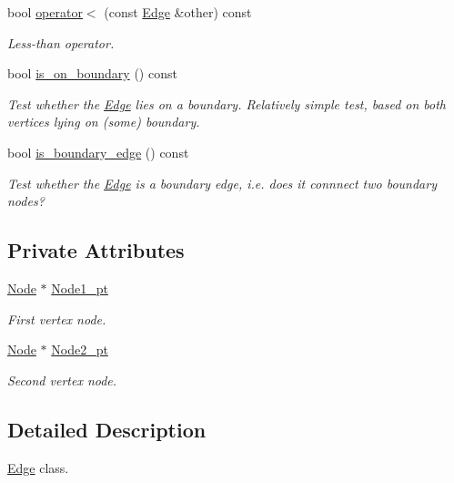 \begin{DoxyCompactItemize}
bool \hyperlink{classoomph_1_1Edge_ad582b8c145bb83d32547e80adb199dc0}{operator$<$} (const \hyperlink{classoomph_1_1Edge}{Edge} \&other) const
\begin{DoxyCompactList}\small\item\em Less-\/than operator. \end{DoxyCompactList}\item 
bool \hyperlink{classoomph_1_1Edge_a4465216fafea9e4d67b3801ba18cd1dc}{is\+\_\+on\+\_\+boundary} () const
\begin{DoxyCompactList}\small\item\em Test whether the \hyperlink{classoomph_1_1Edge}{Edge} lies on a boundary. Relatively simple test, based on both vertices lying on (some) boundary. \end{DoxyCompactList}\item 
bool \hyperlink{classoomph_1_1Edge_aa19b9b455032267cae828ede9c6b5ad6}{is\+\_\+boundary\+\_\+edge} () const
\begin{DoxyCompactList}\small\item\em Test whether the \hyperlink{classoomph_1_1Edge}{Edge} is a boundary edge, i.\+e. does it connnect two boundary nodes? \end{DoxyCompactList}\end{DoxyCompactItemize}
\subsection*{Private Attributes}
\begin{DoxyCompactItemize}
\item 
\hyperlink{classoomph_1_1Node}{Node} $\ast$ \hyperlink{classoomph_1_1Edge_abeda3f3e0e770102690fe836c1a5ee70}{Node1\+\_\+pt}
\begin{DoxyCompactList}\small\item\em First vertex node. \end{DoxyCompactList}\item 
\hyperlink{classoomph_1_1Node}{Node} $\ast$ \hyperlink{classoomph_1_1Edge_ad5c83aa8a63acf45173e5f255477a9b9}{Node2\+\_\+pt}
\begin{DoxyCompactList}\small\item\em Second vertex node. \end{DoxyCompactList}\end{DoxyCompactItemize}


\subsection{Detailed Description}
\hyperlink{classoomph_1_1Edge}{Edge} class. 

